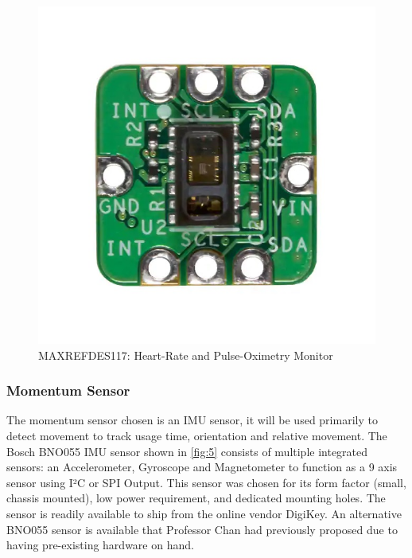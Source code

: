 \documentclass{article}
\begin{document}
\begin{figure}[!h]
    \centering
    \includegraphics[scale=0.25]{sysc4907_MFG_MAXREFDES117.jpg}
    \caption{MAXREFDES117: Heart-Rate and Pulse-Oximetry Monitor}
    \label{fig:4}
\end{figure}

\subsubsection{Momentum Sensor}
The momentum sensor chosen is an IMU sensor, it will be used primarily to detect movement to track usage time, orientation and relative movement. The Bosch BNO055 IMU sensor shown in \autoref{fig:5} consists of multiple integrated sensors: an Accelerometer, Gyroscope and Magnetometer to function as a 9 axis sensor using I²C or SPI Output. This sensor was chosen for its form factor (small, chassis mounted), low power requirement, and dedicated mounting holes. The sensor is readily available to ship from the online vendor DigiKey. An alternative BNO055 sensor is available that Professor Chan had previously proposed due to having pre-existing hardware on hand.
\end{document}
